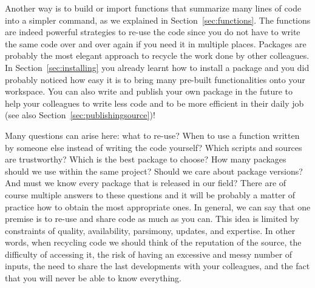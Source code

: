 Another way is to build or import functions that summarize many lines of code into a simpler command, as we explained in Section~\ref{sec:functions}. The functions are indeed powerful strategies to re-use the code since you do not have to write the same code over and over again if you need it in multiple places. Packages are probably the most elegant approach to recycle the work done by other colleagues. In Section~\ref{sec:installing} you already learnt how to install a package and you did probably noticed how easy it is to bring many pre-built functionalities onto your workspace. You can also write and publish your own package in the future to help your colleagues to write less code and to be more efficient in their daily job (see also Section~\ref{sec:publishingsource})!

Many questions can arise here: what to re-use? When to use a function written by someone else instead of writing the code yourself? Which scripts and sources are trustworthy? Which is the best package to choose? How many packages should we use within the same project? Should we care about package versions? And must we know every package that is released in our field? There are of course multiple answers to these questions and it will be probably a matter of practice how to obtain the most appropriate ones. In general, we can say that one premise is to re-use and share code as much as you can. This idea is limited by constraints of quality, availability, parsimony, updates, and expertise. In other words, when recycling code we should think of the reputation of the source, the difficulty of accessing it, the risk of having an excessive and messy number of inputs, the need to share the last developments with your colleagues, and the fact that you will never be able to know everything.

